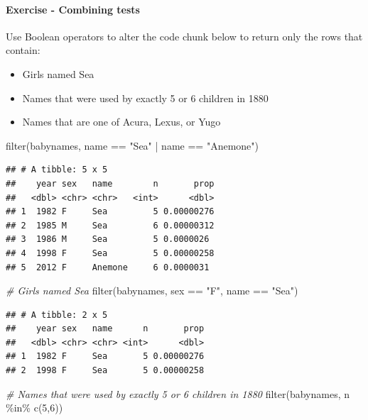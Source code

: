 \documentclass[
]{article}
\newenvironment{Shaded}{\begin{snugshade}}{\end{snugshade}}
\newcommand{\CommentTok}[1]{\textcolor[rgb]{0.56,0.35,0.01}{\textit{#1}}}
\newcommand{\DecValTok}[1]{\textcolor[rgb]{0.00,0.00,0.81}{#1}}
\newcommand{\FunctionTok}[1]{\textcolor[rgb]{0.00,0.00,0.00}{#1}}
\newcommand{\NormalTok}[1]{#1}
\newcommand{\SpecialCharTok}[1]{\textcolor[rgb]{0.00,0.00,0.00}{#1}}
\newcommand{\StringTok}[1]{\textcolor[rgb]{0.31,0.60,0.02}{#1}}
\providecommand{\tightlist}{%
  \setlength{\itemsep}{0pt}\setlength{\parskip}{0pt}}
\begin{document}
\hypertarget{exercise---combining-tests}{%
\paragraph{Exercise - Combining
tests}\label{exercise---combining-tests}}

Use Boolean operators to alter the code chunk below to return only the
rows that contain:

\begin{itemize}
\tightlist
\item
  Girls named Sea
\item
  Names that were used by exactly 5 or 6 children in 1880
\item
  Names that are one of Acura, Lexus, or Yugo
\end{itemize}

\begin{Shaded}
\begin{Highlighting}[]
\FunctionTok{filter}\NormalTok{(babynames, name }\SpecialCharTok{==} \StringTok{"Sea"} \SpecialCharTok{|}\NormalTok{ name }\SpecialCharTok{==} \StringTok{"Anemone"}\NormalTok{)}
\end{Highlighting}
\end{Shaded}

\begin{verbatim}
## # A tibble: 5 x 5
##    year sex   name        n       prop
##   <dbl> <chr> <chr>   <int>      <dbl>
## 1  1982 F     Sea         5 0.00000276
## 2  1985 M     Sea         6 0.00000312
## 3  1986 M     Sea         5 0.0000026 
## 4  1998 F     Sea         5 0.00000258
## 5  2012 F     Anemone     6 0.0000031
\end{verbatim}

\begin{Shaded}
\begin{Highlighting}[]
\CommentTok{\# Girls named Sea}
\FunctionTok{filter}\NormalTok{(babynames, sex }\SpecialCharTok{==} \StringTok{"F"}\NormalTok{, name }\SpecialCharTok{==} \StringTok{"Sea"}\NormalTok{)}
\end{Highlighting}
\end{Shaded}

\begin{verbatim}
## # A tibble: 2 x 5
##    year sex   name      n       prop
##   <dbl> <chr> <chr> <int>      <dbl>
## 1  1982 F     Sea       5 0.00000276
## 2  1998 F     Sea       5 0.00000258
\end{verbatim}

\begin{Shaded}
\begin{Highlighting}[]
\CommentTok{\# Names that were used by exactly 5 or 6 children in 1880}
\FunctionTok{filter}\NormalTok{(babynames, n }\SpecialCharTok{\%in\%} \FunctionTok{c}\NormalTok{(}\DecValTok{5}\NormalTok{,}\DecValTok{6}\NormalTok{))}
\end{Highlighting}
\end{Shaded}
\end{document}
